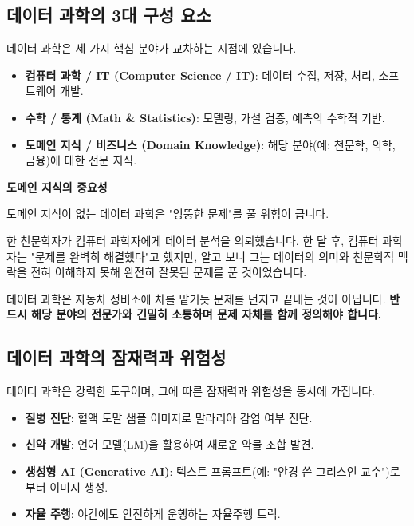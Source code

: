 \documentclass[11pt,a4paper]{book}
\theoremstyle{definition}
\begin{document}
\subsection{데이터 과학의 3대 구성 요소}
데이터 과학은 세 가지 핵심 분야가 교차하는 지점에 있습니다.

\begin{itemize}
    \item \textbf{컴퓨터 과학 / IT (Computer Science / IT)}: 데이터 수집, 저장, 처리, 소프트웨어 개발.
    \item \textbf{수학 / 통계 (Math \& Statistics)}: 모델링, 가설 검증, 예측의 수학적 기반.
    \item \textbf{도메인 지식 / 비즈니스 (Domain Knowledge)}: 해당 분야(예: 천문학, 의학, 금융)에 대한 전문 지식.
\end{itemize}

\begin{warningbox}
\textbf{도메인 지식의 중요성}

도메인 지식이 없는 데이터 과학은 "엉뚱한 문제"를 풀 위험이 큽니다.

한 천문학자가 컴퓨터 과학자에게 데이터 분석을 의뢰했습니다. 한 달 후, 컴퓨터 과학자는 "문제를 완벽히 해결했다"고 했지만, 알고 보니 그는 데이터의 의미와 천문학적 맥락을 전혀 이해하지 못해 완전히 잘못된 문제를 푼 것이었습니다.

데이터 과학은 자동차 정비소에 차를 맡기듯 문제를 던지고 끝내는 것이 아닙니다. \textbf{반드시 해당 분야의 전문가와 긴밀히 소통하며 문제 자체를 함께 정의해야 합니다.}
\end{warningbox}

\subsection{데이터 과학의 잠재력과 위험성}
데이터 과학은 강력한 도구이며, 그에 따른 잠재력과 위험성을 동시에 가집니다.

\begin{tcolorbox}[colback=green!5, colframe=green!50!black, title={👍 데이터 과학의 잠재력}]
\begin{itemize}
    \item \textbf{질병 진단}: 혈액 도말 샘플 이미지로 말라리아 감염 여부 진단.
    \item \textbf{신약 개발}: 언어 모델(LM)을 활용하여 새로운 약물 조합 발견.
    \item \textbf{생성형 AI (Generative AI)}: 텍스트 프롬프트(예: "안경 쓴 그리스인 교수")로부터 이미지 생성.
    \item \textbf{자율 주행}: 야간에도 안전하게 운행하는 자율주행 트럭.
\end{itemize}
\end{tcolorbox}
\end{document}
